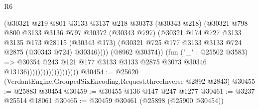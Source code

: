 \begin{lexlean}{R6}
\begin{coremodule}
                                          (@30321
                                            @219
                                            @801
                                            @3133
                                            @3137
                                            @218
                                            @30373
                                            (@30343 @218)
                                            (@30321
                                              @798
                                              @800
                                              @3133
                                              @3136
                                              @797
                                              @30372
                                              (@30343 @797)
                                              (@30321
                                                @174
                                                @727
                                                @3133
                                                @3135
                                                @173
                                                @28115
                                                (@30343 @173)
                                                (@30321
                                                  @725
                                                  @177
                                                  @3133
                                                  @3133
                                                  @724
                                                  @2875
                                                  (@30343 @724)
                                                  @30346))))
                                          (@8962 @30374))
                                        (fun ("_" : @25502 @3583) =>
                                        @30354
                                          @243
                                          @121
                                          @177
                                          @3133
                                          @3133
                                          @2875
                                          @3073
                                          @30346
                                          @13136)))))))))))))))))))
@30454 := @25620 (VerdantEngine.GroupedSixEncoding.Request.threeInverse @2892 @2843)
@30455 := @25883 @30454
@30459 := @30455 @136 @147 @247 @1277
@30461 := @3237 @25514 @18061
@30465 := @30459 @30461 (@25898 (@25900 @30454))

\end{coremodule}
\end{lexlean}
